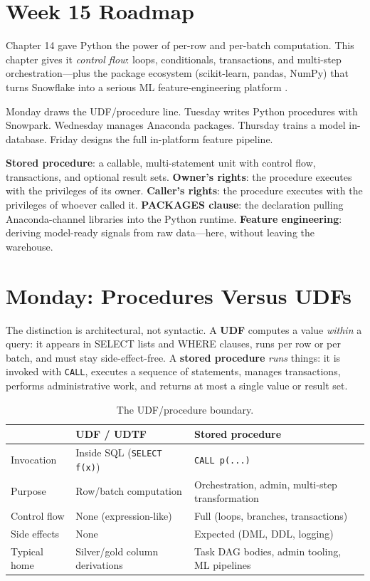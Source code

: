 \section{Week 15 Roadmap}
Chapter 14 gave Python the power of per-row and per-batch computation. This chapter gives it \emph{control flow}: loops, conditionals, transactions, and multi-step orchestration---plus the package ecosystem (scikit-learn, pandas, NumPy) that turns Snowflake into a serious ML feature-engineering platform \cite{snowflakeStoredProceduresDocs}.

Monday draws the UDF/procedure line. Tuesday writes Python procedures with Snowpark. Wednesday manages Anaconda packages. Thursday trains a model in-database. Friday designs the full in-platform feature pipeline.

\begin{keyterms}
\textbf{Stored procedure}: a callable, multi-statement unit with control flow, transactions, and optional result sets.\quad
\textbf{Owner's rights}: the procedure executes with the privileges of its owner.\quad
\textbf{Caller's rights}: the procedure executes with the privileges of whoever called it.\quad
\textbf{PACKAGES clause}: the declaration pulling Anaconda-channel libraries into the Python runtime.\quad
\textbf{Feature engineering}: deriving model-ready signals from raw data---here, without leaving the warehouse.
\end{keyterms}

\section{Monday: Procedures Versus UDFs}
The distinction is architectural, not syntactic. A \textbf{UDF} computes a value \emph{within} a query: it appears in SELECT lists and WHERE clauses, runs per row or per batch, and must stay side-effect-free. A \textbf{stored procedure} \emph{runs} things: it is invoked with \texttt{CALL}, executes a sequence of statements, manages transactions, performs administrative work, and returns at most a single value or result set.

\begin{table}[H]
\centering
\small
\begin{tabular}{@{}p{4.4cm}p{4.6cm}p{4.6cm}@{}}
\toprule
 & \textbf{UDF / UDTF} & \textbf{Stored procedure} \\
\midrule
Invocation & Inside SQL (\texttt{SELECT f(x)}) & \texttt{CALL p(...)} \\
Purpose & Row/batch computation & Orchestration, admin, multi-step transformation \\
Control flow & None (expression-like) & Full (loops, branches, transactions) \\
Side effects & None & Expected (DML, DDL, logging) \\
Typical home & Silver/gold column derivations & Task DAG bodies, admin tooling, ML pipelines \\
\bottomrule
\end{tabular}
\caption{The UDF/procedure boundary.}
\label{tab:chapter15-udf-vs-proc}
\end{table}

